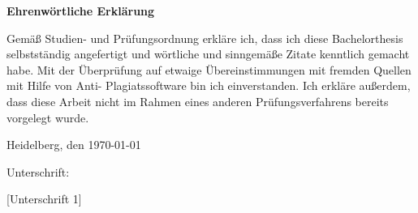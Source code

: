 \newpage
\fontsize{18pt}{0pt}\textbf{Ehrenwörtliche Erklärung}
\parskip=32pt

\noindent Gemäß Studien- und Prüfungsordnung erkläre ich, dass ich diese 
Bachelorthesis selbstständig angefertigt und wörtliche und sinngemäße 
Zitate kenntlich gemacht habe. Mit der Überprüfung auf etwaige 
Übereinstimmungen mit fremden Quellen mit Hilfe von Anti- Plagiatssoftware bin
ich einverstanden. Ich erkläre außerdem, dass diese Arbeit nicht im Rahmen 
eines anderen Prüfungsverfahrens bereits vorgelegt wurde. 
\parskip=32pt

\noindent Heidelberg, den \today
\parskip=32pt

\noindent Unterschrift: %

[Unterschrift 1]

